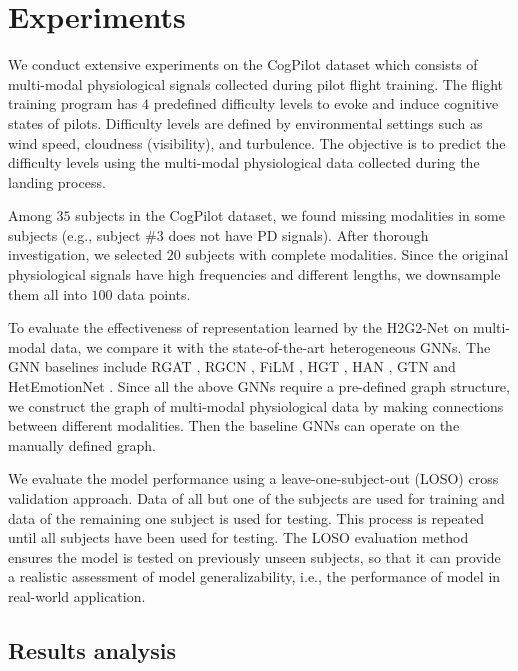 \documentclass[letterpaper]{article} %
\begin{document}
\section{Experiments}

We conduct extensive experiments on the CogPilot dataset which consists of multi-modal physiological signals collected during pilot flight training. The flight training program has $4$ predefined difficulty levels to evoke and induce cognitive states of pilots. Difficulty levels are defined by environmental settings such as wind speed, cloudness (visibility), and turbulence. The objective is to predict the difficulty levels using the multi-modal physiological data collected during the landing process.

Among $35$ subjects in the CogPilot dataset, we found missing modalities in some subjects (e.g., subject \#3 does not have PD signals). After thorough investigation, we selected $20$ subjects with complete modalities. Since the original physiological signals have high frequencies and different lengths, we downsample them all into $100$ data points.

To evaluate the effectiveness of representation learned by the H2G2-Net on multi-modal data, we compare it with the state-of-the-art heterogeneous GNNs. The GNN baselines include RGAT \cite{busbridge2019relational}, RGCN \cite{schlichtkrull2018modeling}, FiLM \cite{brockschmidt2020gnn}, HGT \cite{hu2020heterogeneous}, HAN \cite{wang2019heterogeneous}, GTN \cite{yun2019graph} and HetEmotionNet \cite{jia2021hetemotionnet}. Since all the above GNNs require a pre-defined graph structure, we construct the graph of multi-modal physiological data by making connections between different modalities. Then the baseline GNNs can operate on the manually defined graph.

We evaluate the model performance using a leave-one-subject-out (LOSO) cross validation approach. Data of all but one of the subjects are used for training and data of the remaining one subject is used for testing. This process is repeated until all subjects have been used for testing. The LOSO evaluation method ensures the model is tested on previously unseen subjects, so that it can provide a realistic assessment of model generalizability, i.e., the performance of model in real-world application.


\subsection{Results analysis}
\end{document}
